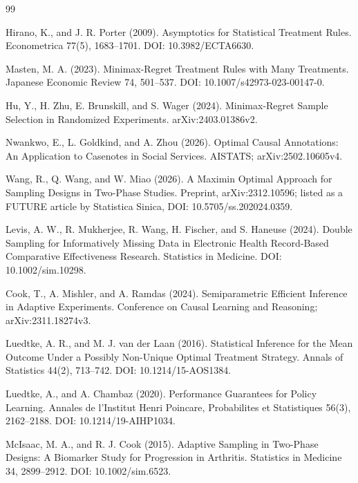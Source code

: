 \documentclass{article}
\begin{document}
\begin{thebibliography}{99}

   Hirano, K., and J. R. Porter (2009). Asymptotics for Statistical Treatment Rules. Econometrica 77(5), 1683--1701. DOI: 10.3982/ECTA6630.

   Masten, M. A. (2023). Minimax-Regret Treatment Rules with Many Treatments. Japanese Economic Review 74, 501--537. DOI: 10.1007/s42973-023-00147-0.

   Hu, Y., H. Zhu, E. Brunskill, and S. Wager (2024). Minimax-Regret Sample Selection in Randomized Experiments. arXiv:2403.01386v2.

   Nwankwo, E., L. Goldkind, and A. Zhou (2026). Optimal Causal Annotations: An Application to Casenotes in Social Services. AISTATS; arXiv:2502.10605v4.

   Wang, R., Q. Wang, and W. Miao (2026). A Maximin Optimal Approach for Sampling Designs in Two-Phase Studies. Preprint, arXiv:2312.10596; listed as a FUTURE article by Statistica Sinica, DOI: 10.5705/ss.202024.0359.

   Levis, A. W., R. Mukherjee, R. Wang, H. Fischer, and S. Haneuse (2024). Double Sampling for Informatively Missing Data in Electronic Health Record-Based Comparative Effectiveness Research. Statistics in Medicine. DOI: 10.1002/sim.10298.

   Cook, T., A. Mishler, and A. Ramdas (2024). Semiparametric Efficient Inference in Adaptive Experiments. Conference on Causal Learning and Reasoning; arXiv:2311.18274v3.

   Luedtke, A. R., and M. J. van der Laan (2016). Statistical Inference for the Mean Outcome Under a Possibly Non-Unique Optimal Treatment Strategy. Annals of Statistics 44(2), 713--742. DOI: 10.1214/15-AOS1384.

   Luedtke, A., and A. Chambaz (2020). Performance Guarantees for Policy Learning. Annales de l'Institut Henri Poincare, Probabilites et Statistiques 56(3), 2162--2188. DOI: 10.1214/19-AIHP1034.

   McIsaac, M. A., and R. J. Cook (2015). Adaptive Sampling in Two-Phase Designs: A Biomarker Study for Progression in Arthritis. Statistics in Medicine 34, 2899--2912. DOI: 10.1002/sim.6523.


\end{thebibliography}
\end{document}

